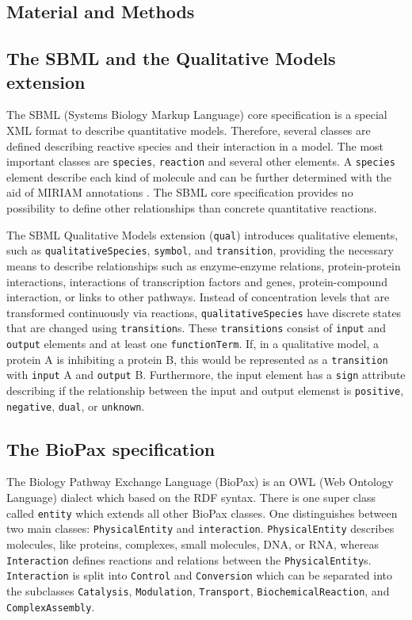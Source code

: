 \documentclass{bioinfo}
\newcommand{\qual}{\texttt{qual}}
\begin{document}
\begin{methods}
\section{Material and Methods}
\subsection{The SBML and the Qualitative Models extension}
The SBML (Systems Biology Markup Language) core specification is a special XML format to describe quantitative models.
Therefore, several classes are defined describing reactive species and their interaction in a model.
The most important classes are \texttt{species}, \texttt{reaction} and several other elements.
A \texttt{species} element describe each kind of molecule and can be further determined with the aid of MIRIAM annotations \citep{Novere2005}.
The SBML core specification provides no possibility to define other relationships than concrete quantitative reactions. \citep{Hucka2003}

The SBML Qualitative Models extension (\qual) introduces qualitative elements, such as \texttt{qualitativeSpecies}, \texttt{symbol}, and \texttt{transition}, providing the necessary means to describe relationships such as enzyme-enzyme relations, protein-protein interactions, interactions of transcription factors and genes, protein-compound interaction, or links to other pathways.
Instead of concentration levels that are transformed continuously via reactions, \texttt{qualitativeSpecies} have discrete states that are changed using \texttt{transition}s.
These \texttt{transitions} consist of \texttt{input} and \texttt{output} elements and at least one \texttt{functionTerm}.
If, in a qualitative model, a protein A is inhibiting a protein B, this would be represented as a \texttt{transition} with \texttt{input} A and \texttt{output} B.
Furthermore, the input element has a \texttt{sign} attribute describing if the relationship between the input and output elemenst is \texttt{positive}, \texttt{negative}, \texttt{dual}, or \texttt{unknown}.
\subsection{The BioPax specification}
The Biology Pathway Exchange Language (BioPax) is an OWL (Web Ontology Language) dialect which based on the RDF syntax.
There is one super class called \texttt{entity} which extends all other BioPax classes.
One distinguishes between two main classes: \texttt{PhysicalEntity} and \texttt{interaction}.
\texttt{PhysicalEntity} describes molecules, like proteins, complexes, small molecules, DNA, or RNA, whereas \texttt{Interaction} defines reactions and relations between the \texttt{PhysicalEntity}s.
\texttt{Interaction} is split into \texttt{Control} and \texttt{Conversion}
which can be separated into the subclasses \texttt{Catalysis}, \texttt{Modulation}, \texttt{Transport}, \texttt{BiochemicalReaction}, and \texttt{Complex\-Assembly}.


\end{methods}
\end{document}
